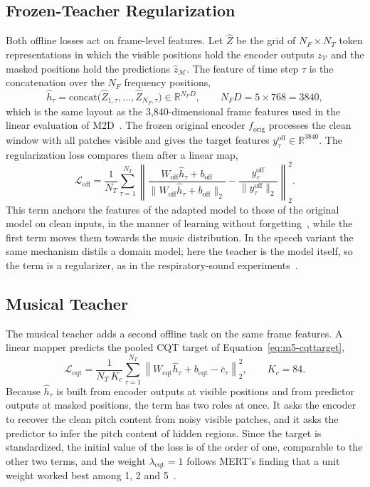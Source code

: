 \documentclass{FastFyp}
\begin{document}
\subsection{Frozen-Teacher Regularization}
Both offline losses act on frame-level features. Let $\hat{Z}$ be the grid of $N_F\times N_T$ token representations in which the visible positions hold the encoder outputs $z_{\mathcal V}$ and the masked positions hold the predictions $\hat{z}_{\mathcal M}$. The feature of time step $\tau$ is the concatenation over the $N_F$ frequency positions,
\begin{equation}
\hat{h}_\tau=\mathrm{concat}\big(\hat{Z}_{1,\tau},\dots,\hat{Z}_{N_F,\tau}\big)\in\mathbb{R}^{N_FD},\qquad N_FD=5\times768=3840,
\label{eq:m5-frame}
\end{equation}
which is the same layout as the 3,840-dimensional frame features used in the linear evaluation of M2D~\cite{ref:M2DGit}. The frozen original encoder $f_{\mathrm{orig}}$ processes the clean window with all patches visible and gives the target features $y^{\mathrm{off}}_\tau\in\mathbb{R}^{3840}$. The regularization loss compares them after a linear map,
\begin{equation}
\mathcal{L}_{\mathrm{off}}=\frac{1}{N_T}\sum_{\tau=1}^{N_T}\left\lVert\frac{W_{\mathrm{off}}\hat{h}_\tau+b_{\mathrm{off}}}{\lVert W_{\mathrm{off}}\hat{h}_\tau+b_{\mathrm{off}}\rVert_2}-\frac{y^{\mathrm{off}}_\tau}{\lVert y^{\mathrm{off}}_\tau\rVert_2}\right\rVert_2^{2}.
\label{eq:m5-off}
\end{equation}
This term anchors the features of the adapted model to those of the original model on clean inputs, in the manner of learning without forgetting~\cite{ref:Li:2018lwf}, while the first term moves them towards the music distribution. In the speech variant the same mechanism distils a domain model; here the teacher is the model itself, so the term is a regularizer, as in the respiratory-sound experiments~\cite{ref:Niizumi:2024m2dx}.

\subsection{Musical Teacher}
The musical teacher adds a second offline task on the same frame features. A linear mapper predicts the pooled CQT target of Equation~\ref{eq:m5-cqttarget},
\begin{equation}
\mathcal{L}_{\mathrm{cqt}}=\frac{1}{N_T\,K_c}\sum_{\tau=1}^{N_T}\left\lVert W_{\mathrm{cqt}}\hat{h}_\tau+b_{\mathrm{cqt}}-\bar{c}_\tau\right\rVert_2^{2},\qquad K_c=84.
\label{eq:m5-cqt}
\end{equation}
Because $\hat{h}_\tau$ is built from encoder outputs at visible positions and from predictor outputs at masked positions, the term has two roles at once. It asks the encoder to recover the clean pitch content from noisy visible patches, and it asks the predictor to infer the pitch content of hidden regions. Since the target is standardized, the initial value of the loss is of the order of one, comparable to the other two terms, and the weight $\lambda_{\mathrm{cqt}}=1$ follows MERT's finding that a unit weight worked best among 1, 2 and 5~\cite{ref:Li:2024mert}.
\end{document}
